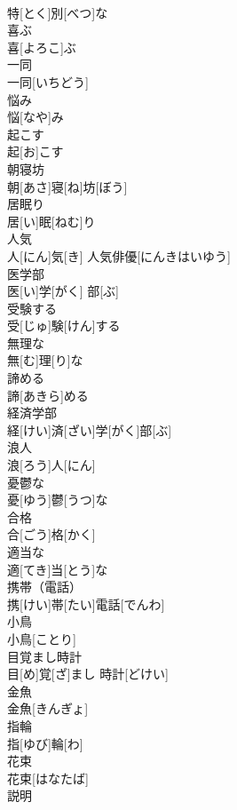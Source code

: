 \documentclass[8pt]{extreport}
\begin{document}
\begin{CJK}{UTF8}{min}
\\	特[とく]別[べつ]な	
\\	喜ぶ	
\\	喜[よろこ]ぶ	
\\	一同	
\\	一同[いちどう]	
\\	悩み	
\\	悩[なや]み	
\\	起こす	
\\	起[お]こす	
\\	朝寝坊	
\\	朝[あさ]寝[ね]坊[ぼう]	
\\	居眠り	
\\	居[い]眠[ねむ]り	
\\	人気	
\\	人[にん]気[き]	人気俳優[にんきはいゆう] 
\\	医学部	
\\	医[い]学[がく] 部[ぶ]	
\\	受験する	
\\	受[じゅ]験[けん]する	
\\	無理な	
\\	無[む]理[り]な	
\\	諦める	
\\	諦[あきら]める	
\\	経済学部	
\\	経[けい]済[ざい]学[がく]部[ぶ]	
\\	浪人	
\\	浪[ろう]人[にん]	
\\	憂鬱な	
\\	憂[ゆう]鬱[うつ]な	
\\	合格	
\\	合[ごう]格[かく]	
\\	適当な	
\\	適[てき]当[とう]な	
\\	携帯（電話）	
\\	携[けい]帯[たい]電話[でんわ]	
\\	小鳥	
\\	小鳥[ことり]	
\\	目覚まし時計	
\\	目[め]覚[ざ]まし 時計[どけい]	
\\	金魚	
\\	金魚[きんぎょ]	
\\	指輪	
\\	指[ゆび]輪[わ]	
\\	花束	
\\	花束[はなたば]	
\\	説明	

\end{CJK}
\end{document}
